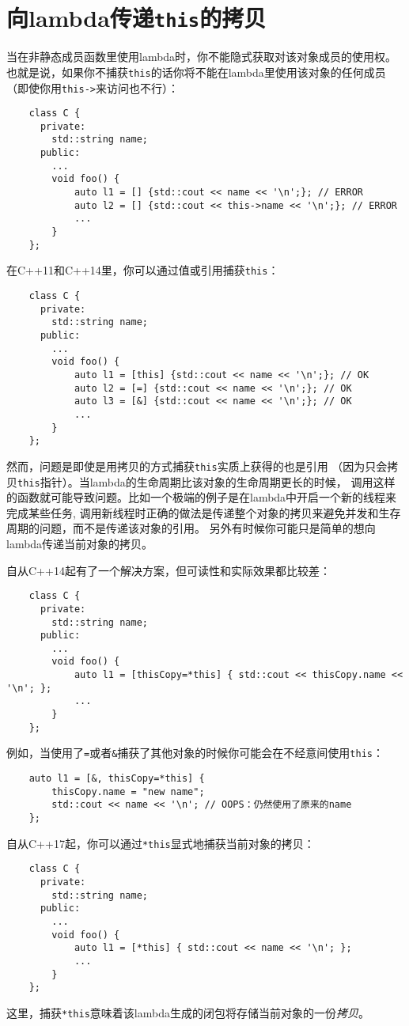 \section{向lambda传递\texttt{this}的拷贝}
当在非静态成员函数里使用lambda时，你不能隐式获取对该对象成员的使用权。
也就是说，如果你不捕获\texttt{this}的话你将不能在lambda里使用该对象的任何成员
（即使你用\texttt{this->}来访问也不行）：
\begin{lstlisting}
    class C {
      private:
        std::string name;
      public:
        ...
        void foo() {
            auto l1 = [] {std::cout << name << '\n';}; // ERROR
            auto l2 = [] {std::cout << this->name << '\n';}; // ERROR
            ...
        }
    };
\end{lstlisting}
在C++11和C++14里，你可以通过值或引用捕获\texttt{this}：
\begin{lstlisting}
    class C {
      private:
        std::string name;
      public:
        ...
        void foo() {
            auto l1 = [this] {std::cout << name << '\n';}; // OK
            auto l2 = [=] {std::cout << name << '\n';}; // OK
            auto l3 = [&] {std::cout << name << '\n';}; // OK
            ...
        }
    };
\end{lstlisting}
然而，问题是即使是用拷贝的方式捕获\texttt{this}实质上获得的也是引用
（因为只会拷贝\texttt{this}指针）。当lambda的生命周期比该对象的生命周期更长的时候，
调用这样的函数就可能导致问题。比如一个极端的例子是在lambda中开启一个新的线程来完成某些任务,
调用新线程时正确的做法是传递整个对象的拷贝来避免并发和生存周期的问题，而不是传递该对象的引用。
另外有时候你可能只是简单的想向lambda传递当前对象的拷贝。

自从C++14起有了一个解决方案，但可读性和实际效果都比较差：
\begin{lstlisting}
    class C {
      private:
        std::string name;
      public:
        ...
        void foo() {
            auto l1 = [thisCopy=*this] { std::cout << thisCopy.name << '\n'; };
            ...
        }
    };
\end{lstlisting}
例如，当使用了\texttt{=}或者\texttt{\&}捕获了其他对象的时候你可能会在不经意间使用\texttt{this}：
\begin{lstlisting}
    auto l1 = [&, thisCopy=*this] {
        thisCopy.name = "new name";
        std::cout << name << '\n'; // OOPS：仍然使用了原来的name
    };
\end{lstlisting}
自从C++17起，你可以通过\texttt{*this}显式地捕获当前对象的拷贝：
\begin{lstlisting}
    class C {
      private:
        std::string name;
      public:
        ...
        void foo() {
            auto l1 = [*this] { std::cout << name << '\n'; };
            ...
        }
    };
\end{lstlisting}
这里，捕获\texttt{*this}意味着该lambda生成的闭包将存储当前对象的一份\emph{拷贝}。


